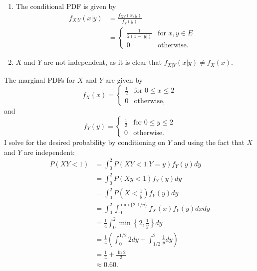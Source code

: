 \begin{problem}{23}
\begin{enumerate}
\item
The conditional PDF is given by
\begin{align*}  
  f_{X|Y}(x|y)&= \frac{f_{XY}(x, y)}{f_Y(y)}\\
& = \begin{cases}
                                   \frac{1}{2(1-|y|)}& \text{for $x, y \in E$} \\
                                   0 & \text{otherwise}.
       \end{cases} \quad
       \end{align*}

\item $X$ and $Y$ are not independent, as it is clear that $f_{X|Y}(x|y) \ne f_X(x)  $.
\end{enumerate}
\end{problem}

\begin{problem}{24}  The marginal PDFs for $X$ and $Y$ are given by 
\[
 f_X(x) =
  \begin{cases}
                                   \frac{1}{2} & \text{for $0 \le x \le 2$} \\
                                   0& \text{otherwise},
   \end{cases}
\]
and
\[
 f_Y(y) =
  \begin{cases}
                                   \frac{1}{2} & \text{for $0 \le y \le 2$} \\
                                   0& \text{otherwise}.
   \end{cases}
\]
I solve for the desired probability by conditioning on $Y$ and using the fact that $X$ and $Y$ are independent:
\begin{align*}
P(XY<1) &= \int_0^2P(XY<1|Y=y)f_Y(y)dy \\
&= \int_0^2P(Xy<1)f_Y(y)dy \\
&= \int_0^2P\left(X<\frac{1}{y}\right)f_Y(y)dy \\
&= \int_0^2 \int_0^{\min \{ 2, 1/y \} }f_X(x) f_Y(y)dxdy \\
&= \frac{1}{4}\int_0^2 \min \left \{ 2, \frac{1}{y} \right \}dy \\
&= \frac{1}{4}\left(\int_0^{1/2}2dy+\int_{1/2}^{2}\frac{1}{y}dy \right)\\
& = \frac{1}{4}+\frac{\ln 2}{2} \\
& \approx 0.60.
\end{align*}

\end{problem}

